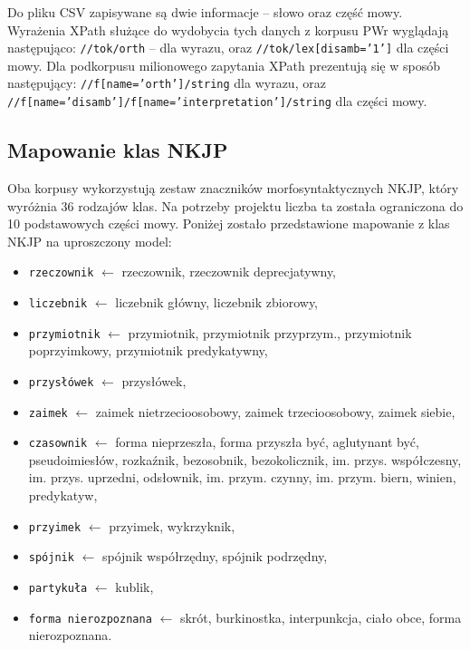 \begin{sloppypar}
Do pliku CSV zapisywane są dwie informacje -- słowo oraz część mowy.
Wyrażenia XPath służące do wydobycia tych danych z korpusu PWr wyglądają następująco:
\texttt{//tok/orth} -- dla wyrazu, oraz \texttt{//tok/lex[disamb='1']} dla części mowy. Dla podkorpusu milionowego zapytania XPath prezentują się w sposób następujący: \texttt{//f[name='orth']/string} dla wyrazu, oraz \texttt{//f[name='disamb']/f[name='interpretation']/string} dla części mowy.
\end{sloppypar}

	\subsection{Mapowanie klas NKJP}
Oba korpusy wykorzystują zestaw znaczników morfosyntaktycznych NKJP, który wyróżnia 36 rodzajów klas.
Na potrzeby projektu liczba ta została ograniczona do 10 podstawowych części mowy. Poniżej zostało przedstawione mapowanie z klas NKJP na uproszczony model:
\begin{itemize}
\item \texttt{rzeczownik} $\leftarrow$ rzeczownik, rzeczownik deprecjatywny,
\item \texttt{liczebnik} $\leftarrow$ liczebnik główny, liczebnik zbiorowy,
\item \texttt{przymiotnik} $\leftarrow$ przymiotnik, przymiotnik przyprzym., przymiotnik poprzyimkowy, przymiotnik predykatywny,
\item \texttt{przysłówek} $\leftarrow$ przysłówek,
\item \texttt{zaimek} $\leftarrow$ zaimek nietrzecioosobowy, zaimek trzecioosobowy, zaimek siebie,
\item \texttt{czasownik} $\leftarrow$ forma nieprzeszła, forma przyszła być, aglutynant być, pseudoimiesłów, rozkaźnik, bezosobnik, bezokolicznik, im. przys. współczesny, im. przys. uprzedni, odsłownik, im. przym. czynny, im. przym. biern, winien, predykatyw,
\item \texttt{przyimek} $\leftarrow$ przyimek, wykrzyknik,
\item \texttt{spójnik} $\leftarrow$ spójnik współrzędny, spójnik podrzędny,
\item \texttt{partykuła} $\leftarrow$ kublik,
\item \texttt{forma nierozpoznana} $\leftarrow$ skrót, burkinostka, interpunkcja, ciało obce, forma nierozpoznana.
\end{itemize}